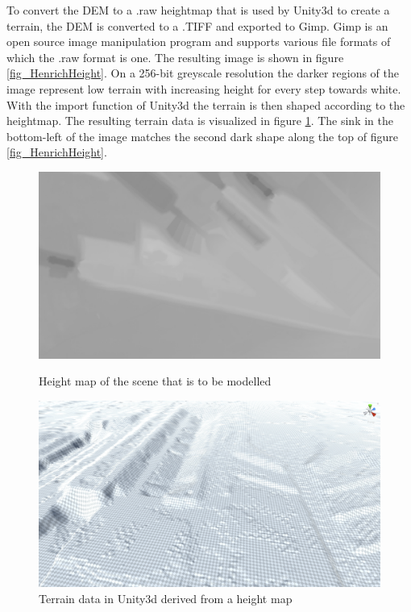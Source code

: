 To convert the \ac{DEM} to a .raw heightmap that is used by Unity3d to create a terrain, the \ac{DEM} is converted to a .TIFF and exported to Gimp. Gimp is an open source image manipulation program and supports various file formats of which the .raw format is one. The resulting image is shown in figure \ref{fig_HenrichHeight}. On a 256-bit greyscale resolution the darker regions of the image represent low terrain with increasing height for every step towards white. With the import function of Unity3d the terrain is then shaped according to the heightmap. The resulting terrain data is visualized in figure \ref{fig_terrainRaw}. The sink in the bottom-left of the image matches the second dark shape along the top of figure \ref{fig_HenrichHeight}.\\ 
\begin{figure}[!htb]
	\begin{minipage}[t]{0.48\textwidth}
		\centering
		\includegraphics[width=.99\linewidth]{Bilder/Henrich_SE.jpeg}
		\caption{Height map of the scene that is to be modelled}\label{fig_HenrichHeight}
	\end{minipage}\hfill
	\begin{minipage}[t]{0.48\textwidth}
		\centering
		\includegraphics[width=.99\linewidth]{Bilder/terrainRaw.png}
		\caption{Terrain data in Unity3d derived from a height map}\label{fig_terrainRaw}
	\end{minipage}
\end{figure}

